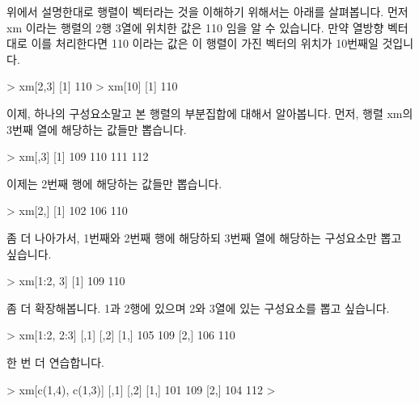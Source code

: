 \documentclass{book}
\begin{document}
위에서 설명한대로 행렬이 벡터라는 것을 이해하기 위해서는 아래를 살펴봅니다. 
먼저 xm 이라는 행렬의 2행 3열에 위치한 값은 110 임을 알 수 있습니다. 
만약 열방향 벡터대로 이를 처리한다면 110 이라는 값은 이 행렬이 가진 벡터의 위치가 10번째일 것입니다.

\begin{Schunk}
\begin{Soutput}
> xm[2,3]
[1] 110
> xm[10]
[1] 110
\end{Soutput}
\end{Schunk}

이제, 하나의 구성요소말고 본 행렬의 부분집합에 대해서 알아봅니다. 
먼저, 행렬 xm의 3번째 열에 해당하는 값들만 뽑습니다. 

\begin{Schunk}
\begin{Soutput}
> xm[,3]
[1] 109 110 111 112
\end{Soutput}
\end{Schunk}

이제는 2번째 행에 해당하는 값들만 뽑습니다. 

\begin{Schunk}
\begin{Soutput}
> xm[2,]
[1] 102 106 110
\end{Soutput}
\end{Schunk}

좀 더 나아가서, 1번째와 2번째 행에 해당하되 3번째 열에 해당하는 구성요소만 뽑고 싶습니다. 
\begin{Schunk}
\begin{Soutput}
> xm[1:2, 3]
[1] 109 110
\end{Soutput}
\end{Schunk}

좀 더 확장해봅니다. 1과 2행에 있으며 2와 3열에 있는 구성요소를 뽑고 싶습니다.

\begin{Schunk}
\begin{Soutput}
> xm[1:2, 2:3]
     [,1] [,2]
[1,]  105  109
[2,]  106  110
\end{Soutput}
\end{Schunk}

한 번 더 연습합니다.

\begin{Schunk}
\begin{Soutput}
> xm[c(1,4), c(1,3)]
     [,1] [,2]
[1,]  101  109
[2,]  104  112
> 
\end{Soutput}
\end{Schunk}
\end{document}
